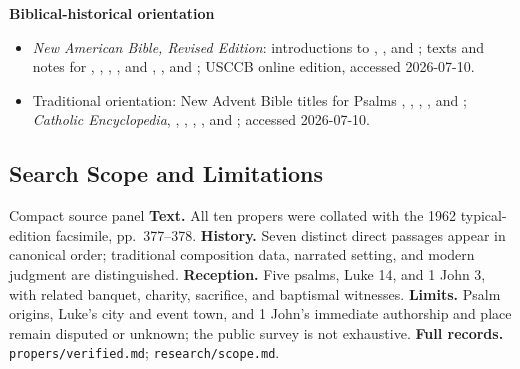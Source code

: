 \begin{deepstudy}
\textbf{Biblical-historical orientation}
{\footnotesize
\begin{itemize}[itemsep=0em,topsep=0.15em,parsep=0pt]
\item \emph{New American Bible, Revised Edition}: introductions to , , and ; texts and notes for , , , , and , , and ; USCCB online edition, accessed 2026-07-10.
\item Traditional orientation: New Advent Bible titles for Psalms , , , , and ; \emph{Catholic Encyclopedia}, , , , , and ; accessed 2026-07-10.
\end{itemize}
}

\subsection*{Search Scope and Limitations}

\begin{studybox}{Compact source panel}
\textbf{Text.} All ten propers were collated with the 1962 typical-edition facsimile, pp.~377--378. \textbf{History.} Seven distinct direct passages appear in canonical order; traditional composition data, narrated setting, and modern judgment are distinguished. \textbf{Reception.} Five psalms, Luke 14, and 1 John 3, with related banquet, charity, sacrifice, and baptismal witnesses. \textbf{Limits.} Psalm origins, Luke's city and event town, and 1 John's immediate authorship and place remain disputed or unknown; the public survey is not exhaustive. \textbf{Full records.} \nolinkurl{propers/verified.md}; \nolinkurl{research/scope.md}.
\end{studybox}


\end{deepstudy}
